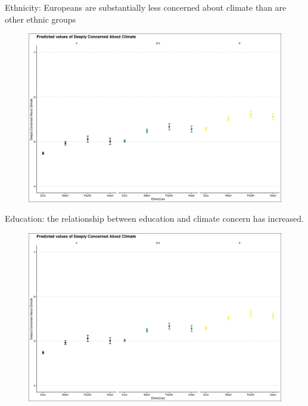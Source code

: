 \documentclass{beamer}
\begin{document}
\begin{frame}{Ethnicity: Europeans are substantially less concerned about climate than are other ethnic groups}
\begin{figure}
\includegraphics[width=.8\textwidth,height=\textheight,keepaspectratio]{Figures/CONCERN_EthnicCats_T.png}
\end{figure}
\end{frame}


\begin{frame}{Education: the relationship between education and climate concern has increased.}
\begin{figure}
\includegraphics[width=.8\textwidth,height=\textheight,keepaspectratio]{Figures/CONCERN_Edu.S.png}
\end{figure}
\end{frame}
\end{document}

